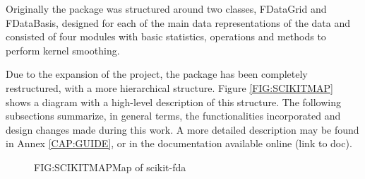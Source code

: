 
Originally the package was structured around two classes, FDataGrid and
FDataBasis, designed for each of the main data representations of the data and
consisted of four modules with basic statistics, operations and methods to
perform kernel smoothing.

Due to the expansion of the project, the package has been completely
restructured, with a more hierarchical structure. Figure \ref{FIG:SCIKITMAP}
shows a diagram with a high-level description of this structure. The following
subsections summarize, in general terms, the functionalities incorporated and
design changes made during this work. A more detailed description may be found
in Annex \ref{CAP:GUIDE}, or in the documentation available online (link to doc).

\begin{figure}[Map of scikit-fda]{FIG:SCIKITMAP}{Map of scikit-fda \cite{scikitfda}}
\end{figure}
